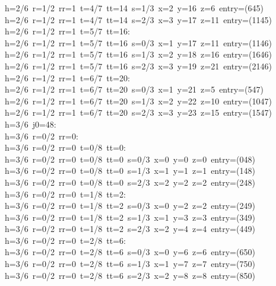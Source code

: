 \begin{tabbing}
h=2/6\ r=1/2\ rr=1\ t=4/7\ tt=14\ s=1/3\ x=2\ y=16\ z=6\ entry=(645)\\[0pt]
h=2/6\ r=1/2\ rr=1\ t=4/7\ tt=14\ s=2/3\ x=3\ y=17\ z=11\ entry=(1145)\\[0pt]
h=2/6\ r=1/2\ rr=1\ t=5/7\ tt=16:\\[0pt]
h=2/6\ r=1/2\ rr=1\ t=5/7\ tt=16\ s=0/3\ x=1\ y=17\ z=11\ entry=(1146)\\[0pt]
h=2/6\ r=1/2\ rr=1\ t=5/7\ tt=16\ s=1/3\ x=2\ y=18\ z=16\ entry=(1646)\\[0pt]
h=2/6\ r=1/2\ rr=1\ t=5/7\ tt=16\ s=2/3\ x=3\ y=19\ z=21\ entry=(2146)\\[0pt]
h=2/6\ r=1/2\ rr=1\ t=6/7\ tt=20:\\[0pt]
h=2/6\ r=1/2\ rr=1\ t=6/7\ tt=20\ s=0/3\ x=1\ y=21\ z=5\ entry=(547)\\[0pt]
h=2/6\ r=1/2\ rr=1\ t=6/7\ tt=20\ s=1/3\ x=2\ y=22\ z=10\ entry=(1047)\\[0pt]
h=2/6\ r=1/2\ rr=1\ t=6/7\ tt=20\ s=2/3\ x=3\ y=23\ z=15\ entry=(1547)\\[0pt]
h=3/6\ j0=48:\\[0pt]
h=3/6\ r=0/2\ rr=0:\\[0pt]
h=3/6\ r=0/2\ rr=0\ t=0/8\ tt=0:\\[0pt]
h=3/6\ r=0/2\ rr=0\ t=0/8\ tt=0\ s=0/3\ x=0\ y=0\ z=0\ entry=(048)\\[0pt]
h=3/6\ r=0/2\ rr=0\ t=0/8\ tt=0\ s=1/3\ x=1\ y=1\ z=1\ entry=(148)\\[0pt]
h=3/6\ r=0/2\ rr=0\ t=0/8\ tt=0\ s=2/3\ x=2\ y=2\ z=2\ entry=(248)\\[0pt]
h=3/6\ r=0/2\ rr=0\ t=1/8\ tt=2:\\[0pt]
h=3/6\ r=0/2\ rr=0\ t=1/8\ tt=2\ s=0/3\ x=0\ y=2\ z=2\ entry=(249)\\[0pt]
h=3/6\ r=0/2\ rr=0\ t=1/8\ tt=2\ s=1/3\ x=1\ y=3\ z=3\ entry=(349)\\[0pt]
h=3/6\ r=0/2\ rr=0\ t=1/8\ tt=2\ s=2/3\ x=2\ y=4\ z=4\ entry=(449)\\[0pt]
h=3/6\ r=0/2\ rr=0\ t=2/8\ tt=6:\\[0pt]
h=3/6\ r=0/2\ rr=0\ t=2/8\ tt=6\ s=0/3\ x=0\ y=6\ z=6\ entry=(650)\\[0pt]
h=3/6\ r=0/2\ rr=0\ t=2/8\ tt=6\ s=1/3\ x=1\ y=7\ z=7\ entry=(750)\\[0pt]
h=3/6\ r=0/2\ rr=0\ t=2/8\ tt=6\ s=2/3\ x=2\ y=8\ z=8\ entry=(850)\\[0pt]

\end{tabbing}

